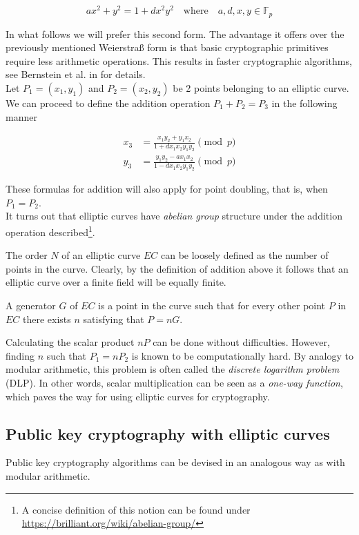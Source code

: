 \[a x^2 + y^2 = 1 + d x^2 y^2 \quad \textrm{where} \quad a, d, x, y \in \mathbb{F}_p \]


In what follows we will prefer this second form. The advantage it offers over the previously mentioned Weierstraß form is that basic cryptographic primitives require less arithmetic operations. This results in faster cryptographic algorithms, see Bernstein et al. in \cite{Bernstein2007} for details.
\\

Let \(P_1 = (x_1, y_1)\) and \(P_2 = (x_2, y_2)\) be 2 points belonging to an elliptic curve. We can proceed to define the addition operation \(P_1 + P_2 = P_3\) in the following manner

\begin{align*}
x_3 & =  \frac{x_1 y_2 + y_1 x_ 2}{1 + d x_1 x_2 y_1 y_2}  \pmod p \\
y_3 & =  \frac{y_1 y_2 - a x_1 x_2}{1 - d x_1 x_2 y_1 y_2} \pmod p 
\end{align*}

These formulas for addition will also apply for point doubling, that is, when \(P_1 = P_2\).
\\

It turns out that elliptic curves have {\em abelian group} structure under the addition operation described\footnote{
A concise definition of this notion can be found under \url{https://brilliant.org/wiki/abelian-group/}}.


The order \(N\) of an elliptic curve \(EC\) can be loosely defined as the number of points in the curve. Clearly, by the definition of addition above it follows that an elliptic curve over a finite field will be equally finite.  


A generator \(G\) of \(EC\) is a point in the curve such that for every other point \(P\) in \(EC\) there exists \(n\) satisfying that \(P = n G\).

Calculating the scalar product \(n P\) can be done without difficulties. However, finding \(n\) such that \(P_1 = n P_2\) is known to be computationally hard. By analogy to modular arithmetic, this problem is often called the {\em discrete logarithm problem} (DLP). In other words, scalar multiplication can be seen as a {\em one-way function}, which paves the way
for using elliptic curves for cryptography. 


\subsection{Public key cryptography with elliptic curves}
\label{ec:keys}
Public key cryptography algorithms can be devised in an analogous way as with modular arithmetic. 

